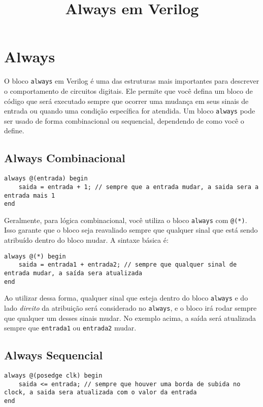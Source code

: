 \documentclass{article}
\title{Always em Verilog}
\date{}
\begin{document}
\maketitle

\section*{Always}

O bloco \texttt{always} em Verilog é uma das estruturas mais importantes para descrever o comportamento de circuitos digitais. Ele permite que você defina um bloco de código que será executado sempre que ocorrer uma mudança em seus sinais de entrada ou quando uma condição específica for atendida. Um bloco \texttt{always} pode ser usado de forma combinacional ou sequencial, dependendo de como você o define.

\subsection*{Always Combinacional}

\begin{lstlisting}
always @(entrada) begin
    saida = entrada + 1; // sempre que a entrada mudar, a saida sera a entrada mais 1
end
\end{lstlisting}

Geralmente, para lógica combinacional, você utiliza o bloco \texttt{always} com \texttt{@(*)}. Isso garante que o bloco seja reavaliado sempre que qualquer sinal que está sendo atribuído dentro do bloco mudar. A sintaxe básica é:

\begin{lstlisting}
always @(*) begin
    saida = entrada1 + entrada2; // sempre que qualquer sinal de entrada mudar, a saída sera atualizada
end
\end{lstlisting}

Ao utilizar dessa forma, qualquer sinal que esteja dentro do bloco \texttt{always} e do lado \emph{direito} da atribuição será considerado no \texttt{always}, e o bloco irá rodar sempre que qualquer um desses sinais mudar. No exemplo acima, a saída será atualizada sempre que \texttt{entrada1} ou \texttt{entrada2} mudar.

\subsection*{Always Sequencial}

\begin{lstlisting}
always @(posedge clk) begin
    saida <= entrada; // sempre que houver uma borda de subida no clock, a saida sera atualizada com o valor da entrada
end
\end{lstlisting}
\end{document}

